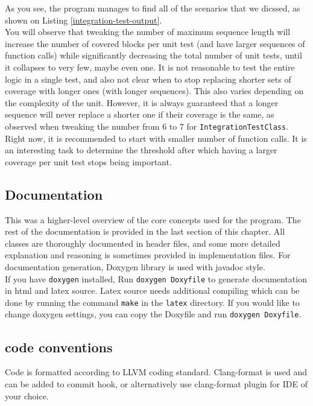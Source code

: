 \documentclass{elteikthesis}[2018/06/06]
\newcommand*{\code}{\lstinline[keywordstyle=\color{violet}, basicstyle=\color{violet}]}
\begin{document}
As you see, the program manages to find all of the scenarios that we dicssed, as shown on Listing \ref{integration-test-output}. \\

You will observe that tweaking the number of maximum sequence length will increase the number of covered blocks per unit test (and have larger sequences of function calls) while significantly decreasing the total number of unit tests, until it collapses to very few, maybe even one. It is not reasonable to test the entire logic in a single test, and also not clear when to stop replacing shorter sets of coverage with longer ones (with longer sequences). This also varies depending on the complexity of the unit. However, it is always guaranteed that a longer sequence will never replace a shorter one if their coverage is the same, as observed when tweaking the number from 6 to 7 for \code{IntegrationTestClass}. \\
Right now, it is recommended to start with smaller number of function calls. It is an interesting task to determine the threshold after which having a larger coverage per unit test stops being important. \\

\subsection{Documentation}
\label{sec-3-1-3}
This was a higher-level overview of the core concepts used for the program. The rest of the documentation is provided in the last section of this chapter. All classes are thoroughly documented in header files, and some more detailed explanation and reasoning is sometimes provided in implementation files. For documentation generation, Doxygen library is used with javadoc style. \\

If you have \code{doxygen} installed, Run \code{doxygen Doxyfile} to generate documentation in html and latex source. Latex source needs additional compiling which can be done by running the command \code{make} in the \code{latex} directory. If you would like to change doxygen settings, you can copy the Doxyfile and run \code{doxygen Doxyfile}. \\
\subsection{code conventions}
\label{sec-3-1-4}
Code is formatted according to LLVM coding standard\cite{coding standards}. Clang-format\cite{clang format} is used and can be added to commit hook, or alternatively use clang-format plugin for IDE of your choice. \\
\end{document}
